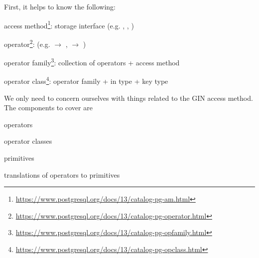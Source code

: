 First, it helps to know the following:

\begin{oparts}
\item
access method\footnote{%
\url{https://www.postgresql.org/docs/13/catalog-pg-am.html}%
}: storage interface (e.g. , , )
\item
operator\footnote{%
\url{https://www.postgresql.org/docs/13/catalog-pg-operator.html}%
}: (e.g.  $\rightarrow$ ,  $\rightarrow$ )
\item
operator family\footnote{%
\url{https://www.postgresql.org/docs/13/catalog-pg-opfamily.html}%
}: collection of operators + access method
\item
operator class\footnote{%
\url{https://www.postgresql.org/docs/13/catalog-pg-opclass.html}%
}: operator family + in type + key type
\end{oparts}

We only need to concern ourselves with things related to the GIN access method.
The components to cover are

\begin{nparts}
\item
operators
\item
operator classes
\item
primitives
\item
translations of operators to primitives
\end{nparts}
